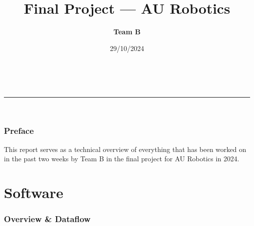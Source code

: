 \documentclass[a4paper,12pt]{article}
\makeatletter
\newcommand{\linia}{\rule{\linewidth}{0.5pt}}
\renewcommand{\maketitle}{
\begin{center}
\vspace{2ex}
{\huge \textbf{\@title}}
\vspace{1ex}
\\
\linia\\
\textsf{\@date \hfill
\@author}
\vspace{4ex}
\end{center}
}
\renewcommand\tableofcontents{%
    \section*{\makebox[\linewidth][c]{\contentsname}%
      \@mkboth{\MakeUppercase\contentsname}{\MakeUppercase\contentsname}}%
    \begin{multicols}{2}%
    \@starttoc{toc}%
    \end{multicols}
    }
\makeatother
\begin{document}
\fontsize{14}{16}\selectfont

\title{Final Project --- AU Robotics}

\date{29/10/2024}

\author{\textbf{Team B}}

\maketitle

\section*{Preface}

This report serves as a technical overview of everything that has been worked on in the past two weeks by Team B in the final project for AU Robotics in 2024.\\

\fontsize{10}{13}\selectfont
\tableofcontents
\fontsize{14}{16}\selectfont
\newpage
\part{Software}
\section{Overview \& Dataflow} \label{dataflow}
\end{document}
